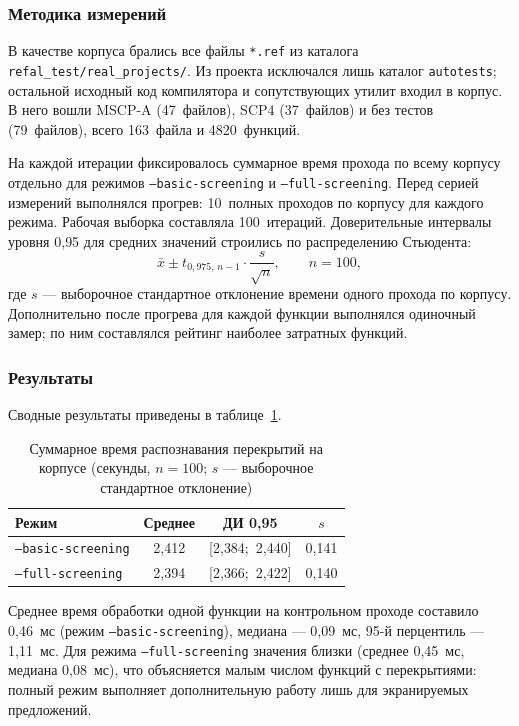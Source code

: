 \subsubsection{Методика измерений}

В качестве корпуса брались все файлы \texttt{*.ref} из каталога \texttt{refal\_test/real\_projects/}.
Из проекта \RL{} исключался лишь каталог \texttt{autotests}; остальной исходный код компилятора и сопутствующих утилит входил в корпус.
В него вошли MSCP-A (47~файлов), SCP4 (37~файлов) и \RL{} без тестов (79~файлов), всего 163~файла и 4820~функций.

На каждой итерации фиксировалось суммарное время прохода по всему корпусу отдельно для режимов \texttt{--basic-screening} и \texttt{--full-screening}.
Перед серией измерений выполнялся прогрев: 10~полных проходов по корпусу для каждого режима.
Рабочая выборка составляла 100~итераций.
Доверительные интервалы уровня 0{,}95 для средних значений строились по распределению Стьюдента:
\[
  \bar{x} \pm t_{0{,}975,\,n-1}\cdot\frac{s}{\sqrt{n}}, \qquad n = 100,
\]
где $s$ --- выборочное стандартное отклонение времени одного прохода по корпусу.
Дополнительно после прогрева для каждой функции выполнялся одиночный замер; по ним составлялся рейтинг наиболее затратных функций.

\subsubsection{Результаты}

Сводные результаты приведены в таблице~\ref{tab:bench-corpus}.

\begin{table}[htbp]
\centering
\caption{Суммарное время распознавания перекрытий на корпусе (секунды, $n = 100$; $s$ --- выборочное стандартное отклонение)}
\label{tab:bench-corpus}
\begin{tabular}{@{}lccc@{}}
\toprule
Режим & Среднее & ДИ 0{,}95 & $s$ \\
\midrule
\texttt{--basic-screening} & 2{,}412 & [2{,}384;\ 2{,}440] & 0{,}141 \\
\texttt{--full-screening}  & 2{,}394 & [2{,}366;\ 2{,}422] & 0{,}140 \\
\bottomrule
\end{tabular}
\end{table}

Среднее время обработки одной функции на контрольном проходе составило 0{,}46~мс (режим \texttt{--basic-screening}), медиана --- 0{,}09~мс, 95-й перцентиль --- 1{,}11~мс.
Для режима \texttt{--full-screening} значения близки (среднее 0{,}45~мс, медиана 0{,}08~мс), что объясняется малым числом функций с перекрытиями: полный режим выполняет дополнительную работу лишь для экранируемых предложений.

